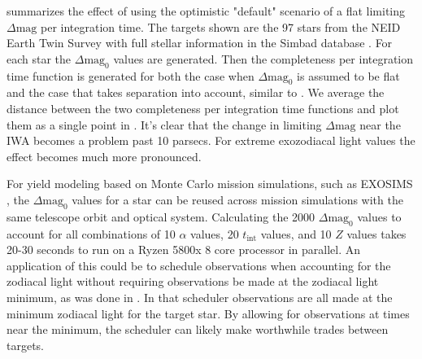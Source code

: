  summarizes the effect of using the optimistic
"default" scenario of a flat limiting $\Delta\textrm{mag}$ per integration time. The targets shown are the 97 stars from the NEID Earth Twin Survey with
full stellar information in the Simbad database
\citep{guptaTargetPrioritization2021}. For each star the $\Delta\textrm{mag}_0$
values are generated. Then the completeness per integration time function is
generated for both the case when $\Delta\textrm{mag}_0$ is assumed to be flat
and the case that takes separation into account, similar to
. We average the distance between the two completeness
per integration time functions and plot them as a single point in
. It's clear that the change in limiting
$\Delta\textrm{mag}$ near the IWA becomes a problem past 10 parsecs. For
extreme exozodiacal light values the effect becomes much more pronounced.

For yield modeling based on Monte Carlo mission simulations, such as EXOSIMS
\citep{savranskyWFIRSTAFTACoronagraphScience2015, delacroixScienceYield2016,
savranskyEXOSIMSExoplanetOpenSource2017}, the $\Delta\textrm{mag}_0$ values for
a star can be reused across mission simulations with the same telescope orbit
and optical system. Calculating the 2000 $\Delta\textrm{mag}_0$ values to
account for all combinations of 10 $\alpha$ values, 20 $t_\textrm{int}$ values,
and 10 $Z$ values takes 20-30 seconds to run on a Ryzen 5800x 8 core processor
in parallel. An application of this could be to schedule observations when
accounting for the zodiacal light without requiring observations be made at the
zodiacal light minimum, as was done in \citet{keithlyOptimalScheduling2020}. In
that scheduler observations are all made at the minimum zodiacal light for the
target star. By allowing for observations at times near the minimum, the
scheduler can likely make worthwhile trades between targets.


